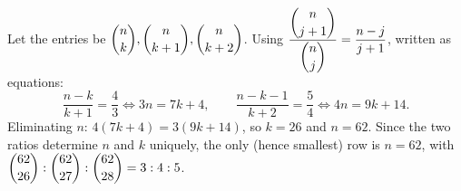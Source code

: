 Let the entries be $\dbinom nk,\dbinom n{k+1},\dbinom n{k+2}$. Using $\dfrac{\dbinom n{j+1}}{\dbinom nj}=\dfrac{n-j}{j+1}$, written as equations:
\[
\dfrac{n-k}{k+1}=\dfrac{4}{3}\iff3n=7k+4,\qquad\dfrac{n-k-1}{k+2}=\dfrac{5}{4}\iff4n=9k+14 .
\]
Eliminating $n$: $4(7k+4)=3(9k+14)$, so $k=26$ and $n=62$. Since the two ratios determine $n$ and $k$ uniquely, the only (hence smallest) row is $n=\boxed{62}$, with $\dbinom{62}{26}:\dbinom{62}{27}:\dbinom{62}{28}=3:4:5$.
